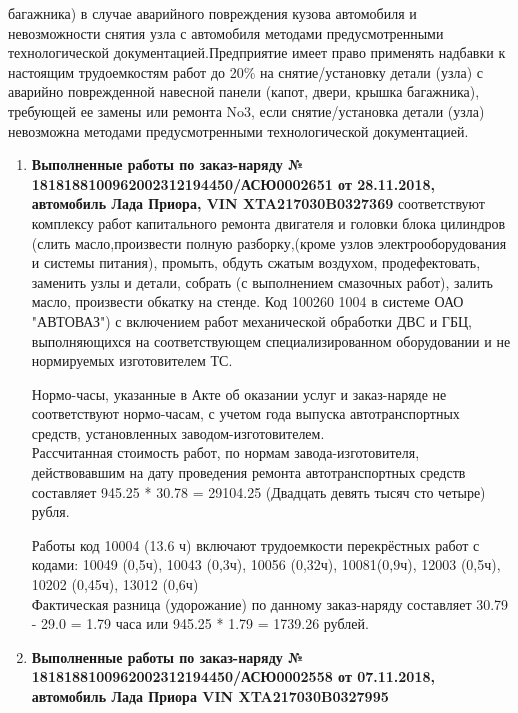 {багажника) в слу­чае аварийного повреждения кузова автомобиля и невозможности снятия узла с автомобиля методами предусмот­ренными технологической документацией.Предприятие имеет право применять надбавки к настоящим трудоемкостям работ до  20\%  на снятие/установку детали (узла) с аварийно поврежденной навесной панели (капот, двери, крышка багажника), требующей ее замены или ремонта No3, если снятие/установка детали (узла) невозможна методами предусмотренными технологической документацией.

}


\begin{enumerate}
	\item \par\textbf{{ Выполненные работы по заказ-наряду № 1818188100962002312194450/АСЮ0002651 от 28.11.2018, автомобиль Лада Приора, VIN XTA217030B0327369}} соответствуют комплексу работ капитального ремонта двигателя и головки блока цилиндров  (слить масло,произвести полную разборку,(кроме узлов электрооборудования и системы питания), промыть, обдуть сжатым воздухом, продефектовать, заменить узлы и детали, собрать (с выполнением смазочных работ), залить масло, произвести обкатку на стенде. Код 100260 1004 в системе ОАО "АВТОВАЗ") с включением работ механической обработки ДВС и ГБЦ, выполняющихся на соответствующем специализированном оборудовании и   не нормируемых изготовителем ТС.\\


Нормо-часы, указанные в Акте об оказании услуг и заказ-наряде не соответствуют нормо-часам, с учетом года выпуска автотранспортных средств, установленных заводом-изготовителем.\\
Рассчитанная стоимость работ, по нормам завода-изготовителя, действовавшим на дату проведения ремонта автотранспортных средств составляет 945.25 * 30.78 =
29104.25 (Двадцать девять тысяч сто четыре) рубля.

Работы код 10004 (13.6 ч)  включают трудоемкости перекрёстных  работ с кодами:  10049 (0,5ч), 10043 (0,3ч), 10056 (0,32ч),  10081(0,9ч), 12003 (0,5ч), 10202 (0,45ч), 13012 (0,6ч)\\
Фактическая разница (удорожание)  по данному заказ-наряду составляет 30.79 - 29.0 = 1.79 часа или  945.25 * 1.79 = 1739.26 рублей.


\item \par\textbf{{ Выполненные работы по заказ-наряду № 1818188100962002312194450/АСЮ0002558 от 07.11.2018, автомобиль Лада Приора  VIN XTA217030B0327995}}




\end{enumerate}

